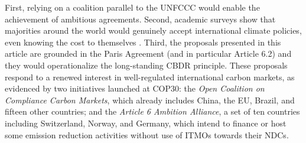 ﻿\documentclass[12pt,english]{article}
\begin{document}
First, relying on a coalition parallel to the UNFCCC would enable the achievement of ambitious agreements. %
Second, %
academic surveys show that majorities around the world would genuinely accept international climate policies, even knowing the cost to themselves \citep{fabre_majority_2025,fabre_public_2025,andre_globally_2024}. %
Third, the proposals presented in this article are grounded in the Paris Agreement (and in particular Article 6.2) and they would operationalize the long-standing CBDR principle. These proposals respond to a renewed interest in well-regulated international carbon markets, as evidenced by two initiatives launched at COP30: the \textit{Open Coalition on Compliance Carbon Markets}, which already includes China, the EU, Brazil, and fifteen other countries; and the \textit{Article 6 Ambition Alliance}, a set of ten countries including Switzerland, Norway, and Germany, which intend to finance or host some emission reduction activities without use of ITMOs towards their NDCs.
\end{document}
